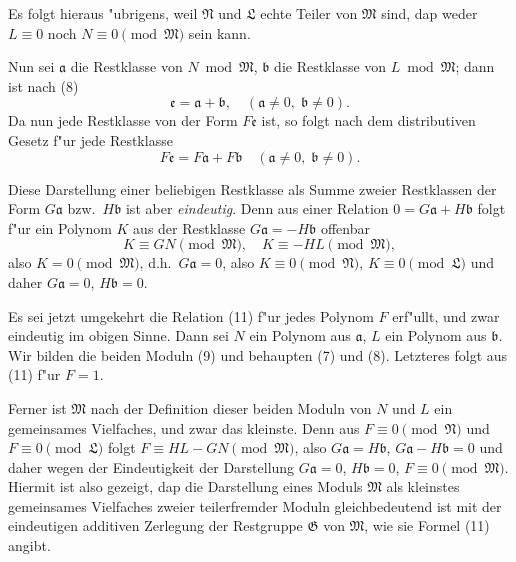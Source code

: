 \documentclass[12pt,a4paper]{article}
\begin{document}
Es folgt hieraus "ubrigens, weil $\mathfrak{N}$ und $\mathfrak{L}$ echte Teiler von $\mathfrak{M}$ sind, dap weder $L \equiv 0$ noch $N \equiv 0 \pmod{\mathfrak{M}}$ sein kann.

Nun sei $\mathfrak{a}$ die Restklasse von $N \bmod \mathfrak{M}$, $\mathfrak{b}$ die Restklasse von $L \bmod \mathfrak{M}$; dann ist nach (8)
\begin{equation}
\mathfrak{e} = \mathfrak{a} + \mathfrak{b}, \quad (\mathfrak{a} \neq 0, \; \mathfrak{b} \neq 0). \tag{8a}
\end{equation}
Da nun jede Restklasse von der Form $F\mathfrak{e}$ ist, so folgt nach dem distributiven Gesetz f"ur jede Restklasse
\begin{equation}
F\mathfrak{e} = F\mathfrak{a} + F\mathfrak{b} \quad (\mathfrak{a} \neq 0, \; \mathfrak{b} \neq 0). \tag{11}
\end{equation}

Diese Darstellung einer beliebigen Restklasse als Summe zweier Restklassen der Form $G\mathfrak{a}$ bzw.\ $H\mathfrak{b}$ ist aber \emph{eindeutig}. Denn aus einer Relation $0 = G\mathfrak{a} + H\mathfrak{b}$ folgt f"ur ein Polynom $K$ aus der Restklasse $G\mathfrak{a} = -H\mathfrak{b}$ offenbar
\[
K \equiv GN \pmod{\mathfrak{M}}, \quad K \equiv -HL \pmod{\mathfrak{M}},
\]
also $K = 0 \pmod{\mathfrak{M}}$, d.h.\ $G\mathfrak{a} = 0$, also $K \equiv 0 \pmod{\mathfrak{N}}$, $K \equiv 0 \pmod{\mathfrak{L}}$ und daher $G\mathfrak{a} = 0$, $H\mathfrak{b} = 0$.

Es sei jetzt umgekehrt die Relation (11) f"ur jedes Polynom $F$ erf"ullt, und zwar eindeutig im obigen Sinne. Dann sei $N$ ein Polynom aus $\mathfrak{a}$, $L$ ein Polynom aus $\mathfrak{b}$. Wir bilden die beiden Moduln (9) und behaupten (7) und (8). Letzteres folgt aus (11) f"ur $F=1$.

Ferner ist $\mathfrak{M}$ nach der Definition dieser beiden Moduln von $N$ und $L$ ein gemeinsames Vielfaches, und zwar das kleinste. Denn aus $F \equiv 0 \pmod{\mathfrak{N}}$ und $F \equiv 0 \pmod{\mathfrak{L}}$ folgt $F \equiv HL - GN \pmod{\mathfrak{M}}$, also $G\mathfrak{a} = H\mathfrak{b}$, $G\mathfrak{a} - H\mathfrak{b} = 0$ und daher wegen der Eindeutigkeit der Darstellung $G\mathfrak{a} = 0$, $H\mathfrak{b} = 0$, $F \equiv 0 \pmod{\mathfrak{M}}$. Hiermit ist also gezeigt, dap die Darstellung eines Moduls $\mathfrak{M}$ als kleinstes gemeinsames Vielfaches zweier teilerfremder Moduln gleichbedeutend ist mit der eindeutigen additiven Zerlegung der Restgruppe $\mathfrak{G}$ von $\mathfrak{M}$, wie sie Formel (11) angibt.
\end{document}
